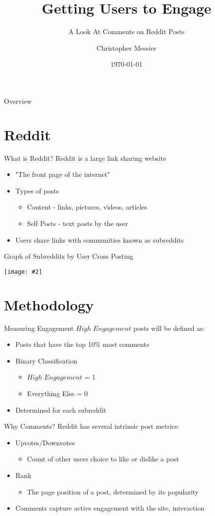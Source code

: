 \documentclass[10pt,t]{beamer}
\title[Engagement]{Getting Users to Engage}
\subtitle{A Look At Comments on Reddit Posts}
\author[Messier]{Christopher Messier}
\institute[GA]{General Assembly\\Washington, D.C.}
\date{\today}
\newcommand{\bi}{\begin{itemize}}                                 %
\newcommand{\ei}{\end{itemize}}                                   %
\newcommand*{\ig}[2]{{\centering\texttt{[image: \#2]}\par}}    %
\begin{document}
\linespread{2}

\begin{frame}
	\titlepage
\end{frame}

\begin{frame}{Overview}
	\tableofcontents
\end{frame}

\section{Reddit}
\begin{frame}{What is Reddit?}
	Reddit is a large link sharing website
	\bi 
		\item "The front page of the internet"
		\item Types of posts
			\bi
				\item Content - links, pictures, videos, articles
				\item Self Posts - text posts by the user
			\ei
		\item Users share links with communities known as subreddits
	\ei 
\end{frame}

\begin{frame}[fragile, c]{Graph of Subreddits by User Cross Posting}
	\ig{width=.75\textwidth}{subreddit_graph.png}
\end{frame}

\section{Methodology}

\begin{frame}{Measuring Engagement}
$High\;Engagement$ posts will be defined as:
	\bi
		\item Posts that have the top 10\% most comments 
		\item Binary Classification
			\bi
				\item $High\;Engagement$ = 1
				\item Everything Else = 0
			\ei
		\item Determined for each subreddit

	\ei
\end{frame}

\begin{frame}{Why Comments?}
Reddit has several intrinsic post metrics:
	\bi
		\item Upvotes/Downvotes
			\bi
				\item Count of other users choice to like or dislike a post
			\ei
		\item Rank
			\bi
				\item The page position of a post, determined by its popularity
			\ei
		\item Comments capture active engagement with the site, interaction
	\ei
\end{frame}
\end{document}
